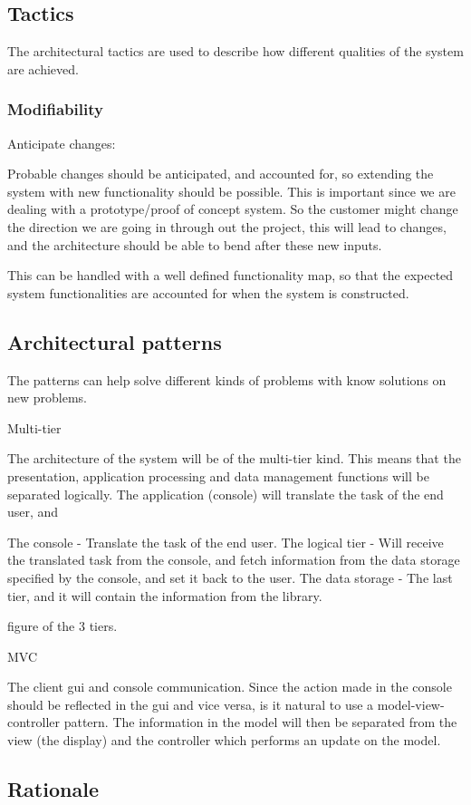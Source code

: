 

\subsection{Tactics}
The architectural tactics are used to describe how different qualities of the system are achieved. 

\subsubsection{Modifiability}
Anticipate changes:

Probable changes should be anticipated, and accounted for, so extending the system with new functionality should be possible. This is important since we are dealing with a prototype/proof of concept system. So the customer might change the direction we are going in through out the project, this will lead to changes, and the architecture should be able to bend after these new inputs. 

This can be handled with a well defined functionality map, so that the expected system functionalities are accounted for when the system is constructed. 


\subsection{Architectural patterns}
The patterns can help solve different kinds of problems with know solutions on new problems.

Multi-tier

The architecture of the system will be of the multi-tier kind. This means that the presentation, application processing and data management functions will be separated logically. The application (console) will translate the task of the end user, and 

The console - Translate the task of the end user.
The logical tier - Will receive the translated task from the console, and fetch information from the data storage specified by the console, and set it back to the user.
The data storage - The last tier, and it will contain the information from the library.

figure of the 3 tiers. 

MVC

The client gui and console communication. Since the action made in the console should be reflected in the gui and vice versa, is it natural to use a model-view-controller pattern. The information in the model will then be separated from the view (the display) and the controller which performs an update on the model. 


\subsection{Rationale}
